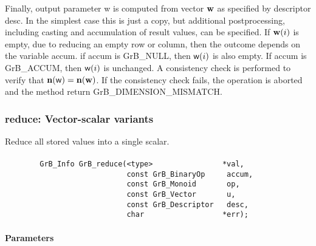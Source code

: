 Finally, output parameter {\sf w} is computed from vector ${\bf w}$
as specified by descriptor {\sf desc}. In the simplest case this
is just a copy, but additional postprocessing, including casting and
accumulation of result values, can be specified. 
 If ${\bf w}(i)$ is empty, due to reducing an empty row or column, then the outcome depends on the variable {\sf accum}.
  if {\sf accum} is GrB\_NULL, then ${\sf w}(i)$ is also empty. If {\sf accum} is GrB\_ACCUM, then ${\sf w}(i)$ is unchanged.
A consistency check is
performed to verify that $\bold{n}({\sf w}) = \bold{n}({\bf w})$. If
the consistency check fails, the operation is aborted and the method
return {\sf GrB\_DIMENSION\_MISMATCH}.


\subsubsection{{\sf reduce}: Vector-scalar variants}
\label{Sec:Reduce_vector_scalar}

Reduce all stored values into a single scalar.





\paragraph{\syntax}

\begin{verbatim}
        GrB_Info GrB_reduce(<type>                *val,
                            const GrB_BinaryOp     accum,
                            const GrB_Monoid       op,
                            const GrB_Vector       u,
                            const GrB_Descriptor   desc,
                            char                  *err);
\end{verbatim}


\paragraph{Parameters}


